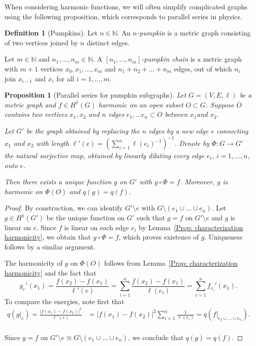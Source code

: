 \documentclass[reqno]{amsart}
\theoremstyle{plain}
\newtheorem{prop}[thm]{Proposition}
\theoremstyle{definition}
\newtheorem{defn}[thm]{Definition}
\theoremstyle{remark}
\numberwithin{equation}{section}
\newcommand{\N}{\mathbb{N}}     %
\begin{document}
When considering harmonic functions, we will often simplify complicated graphs using the following proposition, which corresponds to parallel series in physics.

	
\begin{defn}[Pumpkins] \label{def: pumpkins}
		Let $n\in \N$. An \emph{$n$-pumpkin} is a metric graph consisting of two vertices joined by $n$ distinct edges.
		
		Let $m\in \N$ and $n_1, \dots, n_m \in \N$. A \emph{$[n_1,\dots, n_m]$-pumpkin chain} is a metric graph with $m + 1$ vertices $x_0, x_1, \dots, x_m$ and $n_1 + n_2 + \dots + n_m$ edges, out of which $n_i$ join $x_{i-1}$ and $x_{i}$ for all $i=1, \dots, m$. 
\end{defn}


\begin{prop}[Parallel series for pumpkin subgraphs] \label{prop: surgery}
	Let $G=(V,E, \ell)$ be a metric graph and $f \in H^1(G)$ harmonic on an open subset $O\subset G$.
	Suppose $ \overline{O}$ contains two vertices $x_1, x_2$ and $n$ edges $e_1, \dots e_n \subset O$ between $x_1 $and $x_2$.

	Let $G'$ be the graph obtained by replacing the $n$ edges by a new edge $e$ connecting $x_1$ and $x_2$ with length $\ell'(e)=\left(\sum_{i=1}^{n} \ell(e_i)^{-1}\right)^{-1}$. Denote by $\Phi\colon G \to G'$ the natural surjective map, obtained by linearly dilating every edge $e_i$, $i = 1, \dots, n$, onto $e$.
	
	Then there exists a unique function $g$ on $G'$ with $g \circ \Phi = f$. Moreover, $g$ is harmonic on $\Phi(O)$ and $q(g) = q(f)$. 
\end{prop}
\begin{proof}
By construction, we can identify $G' \setminus e$ with $G \setminus (e_1 \cup \dots \cup e_n)$. Let $g \in H^1(G')$ be the unique function on $G'$ such that $g = f$ on $G' \setminus e$ and $g$ is linear on $e$. Since $f$ is linear on each edge $e_i$ by Lemma~\ref{Prop: characterization harmonicity}, we obtain that $g \circ \Phi = f$, which proves existence of $g$. Uniqueness follows by a similar argument.

The harmonicity of $g$ on $\Phi(O)$ follows from Lemma~\ref{Prop: characterization harmonicity} and the fact that
\[
g_e'(x_1)= \frac{f(x_2) - f(x_1)}{\ell'(e)} = \sum_{i=1}^n \frac{f(x_2) - f(x_1)}{\ell(e_i)} = \sum_{i=1}^n f_{e_i}'(x_1). 
\]
To compare the energies, note first that
	\begin{align*}
		q(g|_e) = \frac{|f(x_1) - f(x_2)|^2}{\ell'(e)} &= |f(x_1) - f(x_2)|^2 \sum_{i=1}^{n} \frac{1}{\ell(e_i)} = q(f|_{e_1\cup \dots \cup e_n}).
	\end{align*}\\
	Since $g = f$ on $  G' \setminus e   \cong G \setminus (e_1 \cup \dots \cup e_n) $, we conclude that $q(g) = q(f)$.
\end{proof}
		
\end{document}
